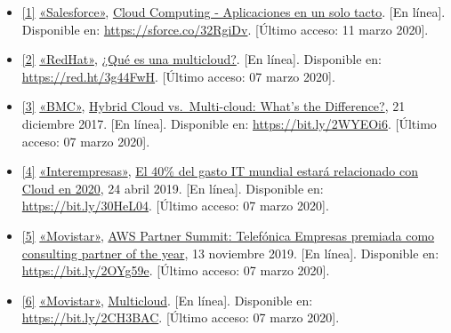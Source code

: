 \documentclass[12pt,spanish,Letterpaper,openany]{book}
\begin{document}
\begin{itemize}
\item
  \hypertarget{articulo14_ref01}{}

  \protect\hyperlink{articulo14_cross01}{{[}1{]}} \href{https://www.salesforce.com/}{«Salesforce»}, \href{https://www.salesforce.com/mx/cloud-computing/}{Cloud Computing - Aplicaciones en un solo tacto}. {[}En línea{]}. Disponible en: \url{https://sforce.co/32RgiDv}. {[}Último acceso: 11 marzo 2020{]}.
\item
  \hypertarget{articulo14_ref02}{}

  \protect\hyperlink{articulo14_cross02}{{[}2{]}} \href{https://www.redhat.com/}{«RedHat»}, \href{https://www.redhat.com/es/topics/cloud-computing/what-is-multicloud}{¿Qué es una multicloud?}. {[}En línea{]}. Disponible en: \url{https://red.ht/3g44FwH}. {[}Último acceso: 07 marzo 2020{]}.
\item
  \hypertarget{articulo14_ref03}{}

  \protect\hyperlink{articulo14_cross03}{{[}3{]}} \href{https://www.bmc.com/}{«BMC»}, \href{https://www.bmc.com/blogs/hybrid-cloud-vs-Multi-cloud-whats-the-difference/}{Hybrid Cloud vs.~Multi-cloud: What's the Difference?}, 21 diciembre 2017. {[}En línea{]}. Disponible en: \url{https://bit.ly/2WYEOi6}. {[}Último acceso: 07 marzo 2020{]}.
\item
  \hypertarget{articulo14_ref04}{}

  \protect\hyperlink{articulo14_cross04}{{[}4{]}} \href{http://www.interempresas.net/}{«Interempresas»}, \href{http://www.interempresas.net/TIC/Articulos/244270-El-40-por-ciento-del-gasto-IT-mundial-estara-relacionado-con-Cloud-en-2020.html}{El 40\% del gasto IT mundial estará relacionado con Cloud en 2020}, 24 abril 2019. {[}En línea{]}. Disponible en: \url{https://bit.ly/30HeL04}. {[}Último acceso: 07 marzo 2020{]}.
\item
  \hypertarget{articulo14_ref05}{}

  \protect\hyperlink{articulo14_cross05}{{[}5{]}} \href{https://comunidad.movistar.es/}{«Movistar»}, \href{https://comunidad.movistar.es/t5/Te-interesa/Estrategia-Multicloud-Empresas-Telef\%C3\%B3nica-galardonada-en-la-AWS/ba-p/3980098}{AWS Partner Summit: Telefónica Empresas premiada como consulting partner of the year}, 13 noviembre 2019. {[}En línea{]}. Disponible en: \url{https://bit.ly/2OYg59e}. {[}Último acceso: 07 marzo 2020{]}.
\item
  \hypertarget{articulo14_ref06}{}

  \protect\hyperlink{articulo14_cross06}{{[}6{]}} \href{http://www.movistar.es/}{«Movistar»}, \href{http://www.movistar.es/grandes-empresas/soluciones/fichas/multicloud/}{Multicloud}. {[}En línea{]}. Disponible en: \url{https://bit.ly/2CH3BAC}. {[}Último acceso: 07 marzo 2020{]}.
\end{itemize}
\end{document}
